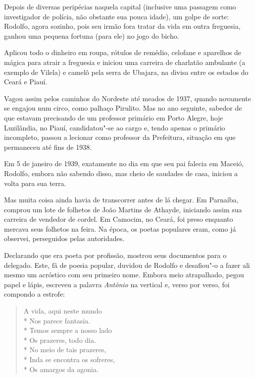 Depois de diversas peripécias naquela capital (inclusive uma passagem
como investigador de polícia, não obstante sua pouca idade), um golpe
de sorte: Rodolfo, agora sozinho, pois seu irmão fora tratar da vida em
outra freguesia, ganhou uma pequena fortuna (para ele) no jogo do
bicho.

Aplicou todo o dinheiro em roupa, rótulos de remédio, celofane e
aparelhos de mágica para atrair a freguesia e iniciou uma carreira de
charlatão ambulante (a exemplo de Vilela) e camelô pela serra de
Ubajara, na divisa entre os estados do Ceará e Piauí.

Vagou assim pelos caminhos do Nordeste até meados de 1937, quando
novamente se engajou num circo, como palhaço Pirulito. Mas no ano
seguinte, sabedor de que estavam precisando de um professor primário em
Porto Alegre, hoje Luzilândia, no Piauí, candidatou"-se ao cargo e,
tendo apenas o primário incompleto, passou a lecionar como professor da
Prefeitura, situação em que permaneceu até fins de 1938.

Em 5 de janeiro de 1939, exatamente no dia em que seu pai falecia em
Maceió, Rodolfo, embora não sabendo disso, mas cheio de saudades de
casa, iniciou a volta para sua terra.

Mas muita coisa ainda havia de transcorrer antes de lá chegar. Em
Parnaíba, comprou um lote de folhetos de João Martins de Athayde,
iniciando assim sua carreira de vendedor de cordel. Em Camocim, no
Ceará, foi preso enquanto mercava seus folhetos na feira. Na época, os
poetas populares eram, como já observei, perseguidos pelas autoridades.


Declarando que era poeta por profissão, mostrou seus documentos para o
delegado. Este, fã de poesia popular, duvidou de Rodolfo e desafiou"-o
a fazer ali mesmo um acróstico com seu primeiro nome. Embora meio
atrapalhado, pegou papel e lápis, escreveu a palavra \textit{Antônio}
na vertical e, verso por verso, foi compondo a estrofe:

\begin{verse}
A vida, aqui neste mundo\\*
Nos parece fantasia.\\*
Temos sempre a nosso lado\\*
Os prazeres, todo dia.\\*
No meio de tais prazeres,\\*
Inda se encontra os sofreres,\\*
Os amargos da agonia.
\end{verse}

